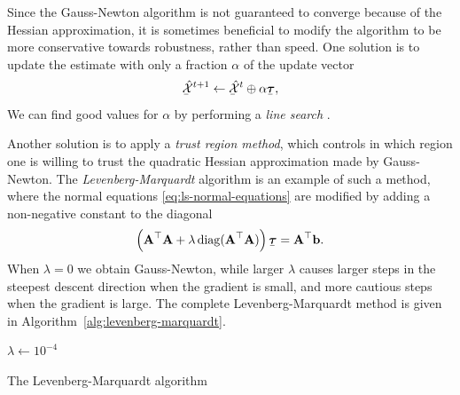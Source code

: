 Since the Gauss-Newton algorithm is not guaranteed to converge because of the Hessian approximation, it is sometimes beneficial to modify the algorithm to be more conservative towards robustness, rather than speed.
One solution is to update the estimate with only a fraction $\alpha$ of the update vector
\begin{equation}
  \ubar{\hat{\cX}}^{t+1} \leftarrow \ubar{\hat{\cX}}^t \oplus \alpha \ubar{\vectau},
\end{equation}
We can find good values for $\alpha$ by performing a \emph{line search} \cite{barfoot2017state}.

Another solution is to apply a \emph{trust region method}, which controls in which region one is willing to trust the quadratic Hessian approximation made by Gauss-Newton.
The \emph{Levenberg-Marquardt} algorithm is an example of such a method, where the normal equations \eqref{eq:ls-normal-equations} are modified by adding a non-negative constant to the diagonal
\begin{equation}
  \left( \matA\trans \matA + \lambda \diag(\matA\trans \matA) \right)\ubar{\vectau} = \matA\trans \vecb.
\end{equation}
When $\lambda = 0$ we obtain Gauss-Newton, while larger $\lambda$ causes larger steps in the steepest descent direction when the gradient is small, and more cautious steps when the gradient is large.
The complete Levenberg-Marquardt method is given in Algorithm~\ref{alg:levenberg-marquardt}.


\begin{algorithm}[H] \label{alg:levenberg-marquardt}
\SetAlgoLined
\DontPrintSemicolon
{}
 \;
 $\lambda \leftarrow 10^{-4}$\;
 \;
 \caption{The Levenberg-Marquardt algorithm}
\end{algorithm}

